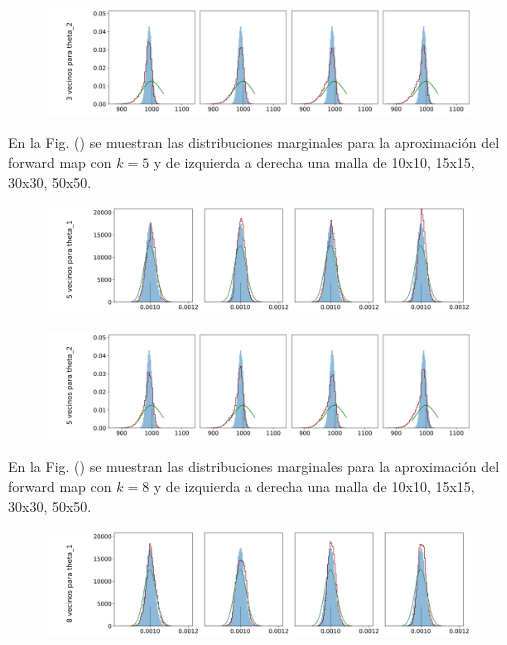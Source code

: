 \begin{figure}[H] 
    \centering 
    \includegraphics[width = 16 cm ]{img/Exp_Central_logistico_Sigma/Figuras/Generales/Convergencia_theta2_1_logistico_sigma.png} 
\end{figure} 

En la Fig. () se muestran las distribuciones marginales para la aproximación del forward map con $k = 5$ y de izquierda a derecha una malla de 10x10, 15x15, 30x30, 50x50.

\begin{figure}[H] 
    \centering 
    \includegraphics[width = 16 cm ]{img/Exp_Central_logistico_Sigma/Figuras/Generales/Convergencia_theta1_2_logistico_sigma.png} 
\end{figure} 

\begin{figure}[H] 
    \centering 
    \includegraphics[width = 16 cm ]{img/Exp_Central_logistico_Sigma/Figuras/Generales/Convergencia_theta2_2_logistico_sigma.png} 
\end{figure} 

En la Fig. () se muestran las distribuciones marginales para la aproximación del forward map con $k = 8$ y de izquierda a derecha una malla de 10x10, 15x15, 30x30, 50x50.

\begin{figure}[H] 
    \centering 
    \includegraphics[width = 16 cm ]{img/Exp_Central_logistico_Sigma/Figuras/Generales/Convergencia_theta1_3_logistico_sigma.png} 
\end{figure} 

